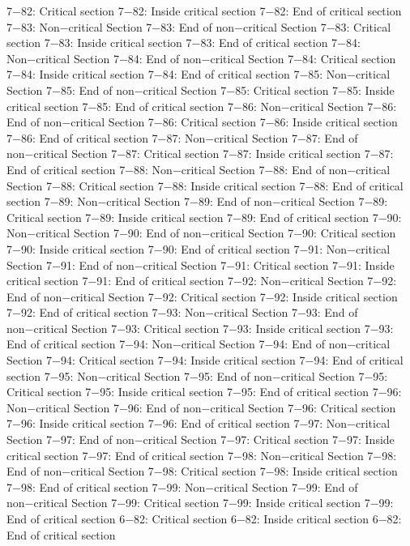 7−82: Critical section
7−82: Inside critical section
7−82: End of critical section
7−83: Non−critical Section
7−83: End of non−critical Section
7−83: Critical section
7−83: Inside critical section
7−83: End of critical section
7−84: Non−critical Section
7−84: End of non−critical Section
7−84: Critical section
7−84: Inside critical section
7−84: End of critical section
7−85: Non−critical Section
7−85: End of non−critical Section
7−85: Critical section
7−85: Inside critical section
7−85: End of critical section
7−86: Non−critical Section
7−86: End of non−critical Section
7−86: Critical section
7−86: Inside critical section
7−86: End of critical section
7−87: Non−critical Section
7−87: End of non−critical Section
7−87: Critical section
7−87: Inside critical section
7−87: End of critical section
7−88: Non−critical Section
7−88: End of non−critical Section
7−88: Critical section
7−88: Inside critical section
7−88: End of critical section
7−89: Non−critical Section
7−89: End of non−critical Section
7−89: Critical section
7−89: Inside critical section
7−89: End of critical section
7−90: Non−critical Section
7−90: End of non−critical Section
7−90: Critical section
7−90: Inside critical section
7−90: End of critical section
7−91: Non−critical Section
7−91: End of non−critical Section
7−91: Critical section
7−91: Inside critical section
7−91: End of critical section
7−92: Non−critical Section
7−92: End of non−critical Section
7−92: Critical section
7−92: Inside critical section
7−92: End of critical section
7−93: Non−critical Section
7−93: End of non−critical Section
7−93: Critical section
7−93: Inside critical section
7−93: End of critical section
7−94: Non−critical Section
7−94: End of non−critical Section
7−94: Critical section
7−94: Inside critical section
7−94: End of critical section
7−95: Non−critical Section
7−95: End of non−critical Section
7−95: Critical section
7−95: Inside critical section
7−95: End of critical section
7−96: Non−critical Section
7−96: End of non−critical Section
7−96: Critical section
7−96: Inside critical section
7−96: End of critical section
7−97: Non−critical Section
7−97: End of non−critical Section
7−97: Critical section
7−97: Inside critical section
7−97: End of critical section
7−98: Non−critical Section
7−98: End of non−critical Section
7−98: Critical section
7−98: Inside critical section
7−98: End of critical section
7−99: Non−critical Section
7−99: End of non−critical Section
7−99: Critical section
7−99: Inside critical section
7−99: End of critical section
6−82: Critical section
6−82: Inside critical section
6−82: End of critical section

